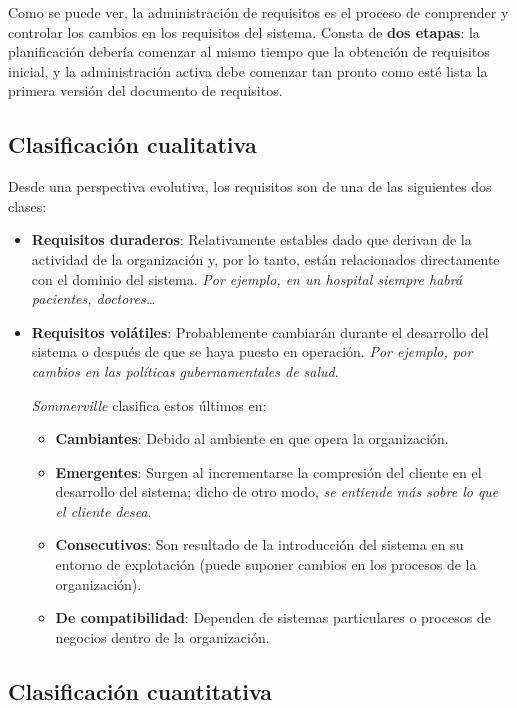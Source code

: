 Como se puede ver, la administración de requisitos es el proceso de comprender y controlar los cambios en los requisitos del sistema. Consta de \textbf{dos etapas}: la planificación debería comenzar al mismo tiempo que la obtención de requisitos inicial, y la administración activa debe comenzar tan pronto como esté lista la primera versión del documento de requisitos.

\subsection{Clasificación cualitativa}

Desde una perspectiva evolutiva, los requisitos son de una de las siguientes dos clases:

\begin{itemize}
    \item \textbf{Requisitos duraderos}: Relativamente estables dado que derivan de la actividad de la organización y, por lo tanto, están relacionados directamente con el dominio del sistema. \textit{Por ejemplo, en un hospital siempre habrá pacientes, doctores\ldots}
    \item \textbf{Requisitos volátiles}: Probablemente cambiarán durante el desarrollo del sistema o después de que se haya puesto en operación. \textit{Por ejemplo, por cambios en las políticas gubernamentales de salud}.
    
    \textit{Sommerville} clasifica estos últimos en:
    \begin{itemize}
        \item \textbf{Cambiantes}: Debido al ambiente en que opera la organización.
        \item \textbf{Emergentes}: Surgen al incrementarse la compresión del cliente en el desarrollo del sistema; dicho de otro modo, \textit{se entiende más sobre lo que el cliente desea}.
        \item \textbf{Consecutivos}: Son resultado de la introducción del sistema en su entorno de explotación (puede suponer cambios en los procesos de la organización).
        \item \textbf{De compatibilidad}: Dependen de sistemas particulares o procesos de negocios dentro de la organización.
    \end{itemize}
\end{itemize}

\subsection{Clasificación cuantitativa}

